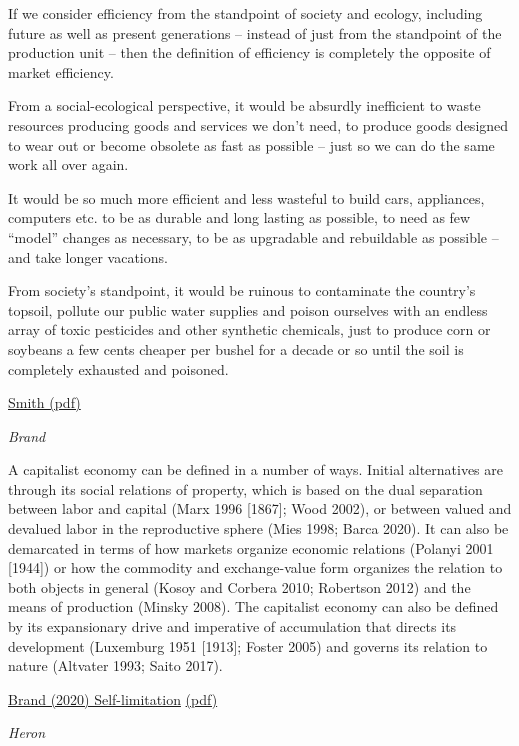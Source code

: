 \documentclass[
]{book}
\begin{document}
If we consider efficiency from the standpoint of society and ecology, including
future as well as present generations -- instead of just from the standpoint of the
production unit -- then the definition of efficiency is completely the opposite of
market efficiency.

From a social-ecological perspective, it would be absurdly
inefficient to waste resources producing goods and services we don't need, to
produce goods designed to wear out or become obsolete as fast as possible -- just so
we can do the same work all over again.

It would be
so much more efficient and less wasteful to build cars, appliances, computers etc. to
be as durable and long lasting as possible, to need as few ``model'' changes as
necessary, to be as upgradable and rebuildable as possible -- and take longer
vacations.

From society's standpoint, it would be
ruinous to contaminate the country's topsoil, pollute our public water supplies and
poison ourselves with an endless array of toxic pesticides and other synthetic
chemicals, just to produce corn or soybeans a few cents cheaper per bushel for a
decade or so until the soil is completely exhausted and poisoned.

\href{pdf/Richard_Smith_Green_Capitalism_the_God_that_Failed.pdf}{Smith (pdf)}

\emph{Brand}

A capitalist economy can be defined in a number of ways. Initial alternatives are through its social relations of property, which is based on the dual separation between labor and capital (Marx 1996 {[}1867{]}; Wood 2002), or between valued and devalued labor in the reproductive sphere (Mies 1998; Barca 2020). It can also be demarcated in terms of how markets organize economic relations (Polanyi 2001 {[}1944{]}) or how the commodity and exchange-value form organizes the relation to both objects in general (Kosoy and Corbera 2010; Robertson 2012) and the means of production (Minsky 2008). The capitalist economy can also be defined by its expansionary drive and imperative of accumulation that directs its development (Luxemburg 1951 {[}1913{]}; Foster 2005) and governs its relation to nature (Altvater 1993; Saito 2017).

\href{https://www.tandfonline.com/doi/full/10.1080/15487733.2021.1940754}{Brand (2020) Self-limitation}
\href{pdf/Brand_2021_Self_Limitation.pdf}{(pdf)}

\emph{Heron}
\end{document}
